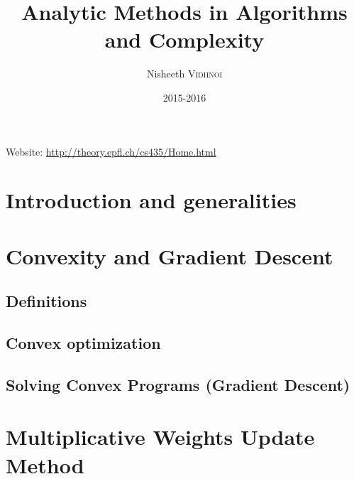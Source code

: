 

\title{Analytic Methods in Algorithms and Complexity}
\author{Nisheeth \textsc{Vidhnoi}}
\date{2015-2016}


\maketitle
\tableofcontents

\newpage

Website: \url{http://theory.epfl.ch/cs435/Home.html}

\chapter*{Introduction and generalities}
    
    
\chapter{Convexity and Gradient Descent}
    \section{Definitions}
        

    \section{Convex optimization}
        
        
    \section{Solving Convex Programs (Gradient Descent)}
        
        
\chapter{Multiplicative Weights Update Method}
    
    



\nocite{*}








